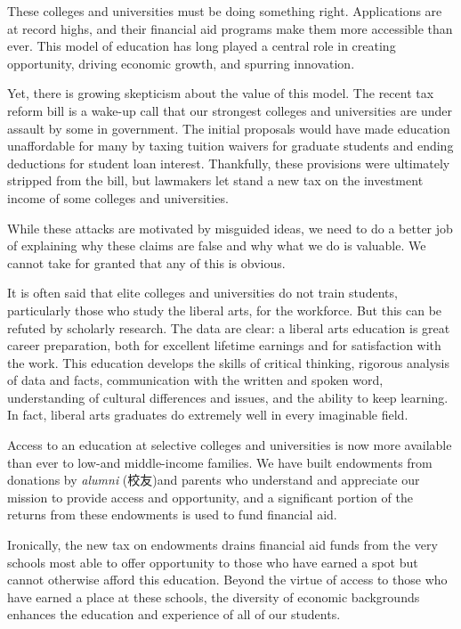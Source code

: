 \documentclass[UTF8,11pt]{ctexart}
\begin{document}
These colleges and universities must be doing something right. Applications are at record highs, and their financial aid programs make them more accessible than ever. This model of education has long played a central role in creating opportunity, driving economic growth, and spurring innovation.


Yet, there is growing skepticism about the value of this model. The recent tax reform bill is a wake-up call that our strongest colleges and universities are under assault by some in government. The initial proposals would have made education unaffordable for many by taxing tuition waivers for graduate students and ending deductions for student loan interest. Thankfully, these provisions were ultimately stripped from the bill, but lawmakers let stand a new tax on the investment income of some colleges and universities.


While these attacks are motivated by misguided ideas, we need to do a better job of explaining why these claims are false and why what we do is valuable. We cannot take for granted that any of this is obvious.


It is often said that elite colleges and universities do not train students, particularly those who study the liberal arts, for the workforce. But this can be refuted by scholarly research. The data are clear: a liberal arts education is great career preparation, both for excellent lifetime earnings and for satisfaction with the work. This education develops the skills of critical thinking, rigorous analysis of data and facts, communication with the written and spoken word, understanding of cultural differences and issues, and the ability to keep learning. In fact, liberal arts graduates do extremely well in every imaginable field.


Access to an education at selective colleges and universities is now more available than ever to low-and middle-income families. We have built endowments from donations by \textit{alumni} (校友)and parents who understand and appreciate our mission to provide access and opportunity, and a significant portion of the returns from these endowments is used to fund financial aid.


Ironically, the new tax on endowments drains financial aid funds from the very schools most able to offer opportunity to those who have earned a spot but cannot otherwise afford this education. Beyond the virtue of access to those who have earned a place at these schools, the diversity of economic backgrounds enhances the education and experience of all of our students.
\end{document}
